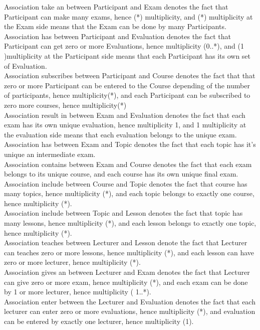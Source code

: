 \documentclass{scrartcl}
\begin{document}
Association take an between Participant and Exam denotes the fact that Participant can make many exams, hence (*) multiplicity, and (*) multiplicity at the Exam side means that the  Exam can be done by many Participants.\\
Association has between Participant and Evaluation denotes the fact that Participant can get zero or more Evaluations, hence multiplicity (0..*), and (1 )multiplicity at the Participant side means that each Participant has its own set of Evaluation.\\
Association subscribes between Participant and Course denotes the fact that that zero or more Participant can be entered to the Course depending of the number of participants, hence multiplicity(*), and each Participant can be subscribed to zero more courses, hence multiplicity(*)\\
Association result in between Exam and Evaluation denotes the fact that each exam has its own unique evaluation, hence multiplicity 1, and 1 multiplicity at the evaluation side means that each evaluation belongs to the unique exam.\\
Association has between Exam and Topic denotes the fact that each topic has it’s unique an intermediate exam. \\
Association contains between Exam and Course denotes the fact that each exam belongs to its unique course, and each course has its own unique final exam. \\
Association include between Course and Topic denotes the fact that course has many topics, hence multiplicity (*), and each topic belongs to exactly one course, hence multiplicity (*). \\
Association include between Topic and Lesson denotes the fact that topic has many lessons, hence multiplicity (*), and each lesson belongs to exactly one topic, hence multiplicity (*). \\
Association teaches between Lecturer and Lesson denote the fact that Lecturer can teaches zero or more lessons, hence multiplicity (*), and each lesson can have zero or more lecturer, hence multiplicity (*). \\
Association gives an between Lecturer and Exam denotes the fact that Lecturer can give zero or more exam, hence multiplicity (*), and each exam can be done by 1 or more lecturer, hence multiplicity ( 1..*). \\
Association enter between the Lecturer and Evaluation denotes the fact that each lecturer can enter zero or more evaluations, hence multiplicity (*), and evaluation can be entered by exactly one lecturer, hence multiplicity (1). \\
\end{document}
